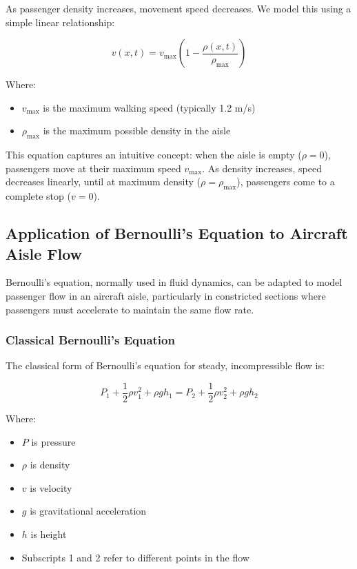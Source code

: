 \documentclass[a4paper,12pt]{article}
\begin{document}
As passenger density increases, movement speed decreases. We model this using a simple linear relationship:

\begin{equation}
v(x,t) = v_{\text{max}} \left(1 - \frac{\rho(x,t)}{\rho_{\text{max}}}\right)
\end{equation}

Where:
\begin{itemize}
    \item $v_{\text{max}}$ is the maximum walking speed (typically 1.2 m/s)
    \item $\rho_{\text{max}}$ is the maximum possible density in the aisle
\end{itemize}

This equation captures an intuitive concept: when the aisle is empty ($\rho = 0$), passengers move at their maximum speed $v_{\text{max}}$. As density increases, speed decreases linearly, until at maximum density ($\rho = \rho_{\text{max}}$), passengers come to a complete stop ($v = 0$).

\subsection{Application of Bernoulli's Equation to Aircraft Aisle Flow}

Bernoulli's equation, normally used in fluid dynamics, can be adapted to model passenger flow in an aircraft aisle, particularly in constricted sections where passengers must accelerate to maintain the same flow rate.

\subsubsection{Classical Bernoulli's Equation}

The classical form of Bernoulli's equation for steady, incompressible flow is:

\begin{equation}
P_1 + \frac{1}{2}\rho v_1^2 + \rho g h_1 = P_2 + \frac{1}{2}\rho v_2^2 + \rho g h_2
\end{equation}

Where:
\begin{itemize}
    \item $P$ is pressure
    \item $\rho$ is density
    \item $v$ is velocity
    \item $g$ is gravitational acceleration
    \item $h$ is height
    \item Subscripts 1 and 2 refer to different points in the flow
\end{itemize}
\end{document}
